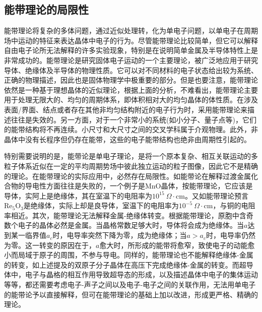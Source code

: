 \subsection{能带理论的局限性} 
能带理论将复杂的多体问题，通过近似处理转，化为单电子问题，以单电子在周期场中运动的特征来表达晶体中电子的行为。尽管能带理论比较简单，但它可以解释自由电子论所无法解释的许多实验现象，特别是在说明简单金属及半导体特性上是非常成功的。能带理论是研究固体电子运动的一个主要理论，被广泛地应用于研究导体、绝缘体及半导体的物理性质。它可以对不同材料的电子状态给出较为系统、正确的物理描述，因此也是固体物理学中极重要的部分。但是也要注意，能带理论依然是一种基于理想晶体的近似理论，根据上面的分析，不难看出，能带理论主要用于处理无限大的、均匀的周期体系，即体积相对大的均匀晶体的体性质。在涉及表面/界面、结点或者存在其他非均匀结构附近的电子行为时，采用能带理论来描述往往是失效的。另一方面，对于一个非常小的系统(如小分子、量子点等)，它们的能带结构将不再连续。小尺寸和大尺寸之间的交叉学科属于介观物理。此外，非晶体中没有长程序但仍存在能带，这些的电子能带结构也绝非由周期性引起的。

特别需要说明的是，能带论是单电子理论，是将一个原本复杂、相互关联运动的多粒子体系近似在一定的平均周期势场中彼此独立运动的粒子图像，因此它不是精确的理论。在能带理论的实际应用中，必然存在局限性。如能带论在解释过渡金属化合物的导电性方面往往是失败的，一个例子是MnO晶体，按能带理论，它应该是导体，实阿上是绝缘体，其在室温下的电阻率为$10^{15}~\Omega\cdot\mathrm{cm}$。又如能带理论预言$\mathrm{Re}_5\mathrm{O}_3$是绝缘体，实际上却是良导体，室温下的电阻率为$10^{-5}~\Omega\cdot\mathrm{cm}$，与铜的电阻率相近。其次，能带理论无法解释金属-绝缘体转变。根据能带理论，原胞中含奇数个电子的晶体必然是金属。当晶格常数足够大时，导体将会成为绝缘体。当$a$达到某一临界值$a_c$时，电导率突然下降为零，成为绝缘体；当$a>a_c$时，电导率仍然为零。这一转变的原因在于，$a$愈大时，所形成的能带将愈窄，致使电子的动能愈小而局域于原子的周围，不参与导电。同样的，能带理论也不能解释绝缘体-金属的转变，如上述提及的双原子分子晶体在高压下完成绝缘体-金属的转变。而超导体中，电子与晶格的相互作用导致超导态的形成，以及描述晶体中电子的集体运动等等，都还需要考虑电子-声子之间以及电子-电子之间的关联作用，无法用单电子的能带论予以直接解释，但可在能带理论的基础上加以改进，形成更严格、精确的理论。


